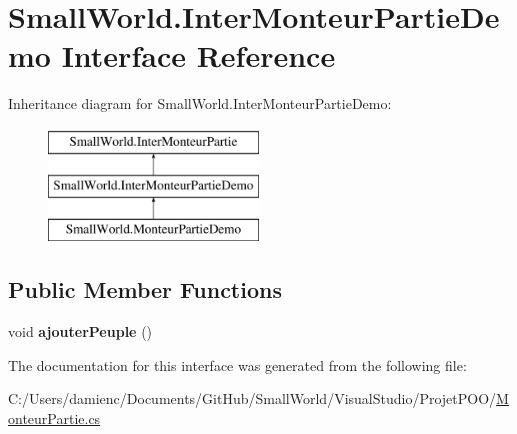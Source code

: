 \hypertarget{interface_small_world_1_1_inter_monteur_partie_demo}{\section{Small\-World.\-Inter\-Monteur\-Partie\-Demo Interface Reference}
\label{interface_small_world_1_1_inter_monteur_partie_demo}
}
Inheritance diagram for Small\-World.\-Inter\-Monteur\-Partie\-Demo\-:\begin{figure}[H]
\begin{center}
\leavevmode
\includegraphics[height=3.000000cm]{interface_small_world_1_1_inter_monteur_partie_demo}
\end{center}
\end{figure}
\subsection*{Public Member Functions}
\begin{DoxyCompactItemize}
\item 
\hypertarget{interface_small_world_1_1_inter_monteur_partie_demo_ae2910d45cecf5c55958360cd5ffb1fee}{void {\bfseries ajouter\-Peuple} ()}\label{interface_small_world_1_1_inter_monteur_partie_demo_ae2910d45cecf5c55958360cd5ffb1fee}

\end{DoxyCompactItemize}


The documentation for this interface was generated from the following file\-:\begin{DoxyCompactItemize}
\item 
C\-:/\-Users/damienc/\-Documents/\-Git\-Hub/\-Small\-World/\-Visual\-Studio/\-Projet\-P\-O\-O/\hyperlink{_monteur_partie_8cs}{Monteur\-Partie.\-cs}\end{DoxyCompactItemize}
